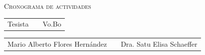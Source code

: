 \documentclass[landscape]{article}
\begin{document}
\begin{figure}[h]
\vspace{-3cm}
\begin{center} {\scshape\LARGE Cronograma de actividades \par} \end{center}
\vspace{0.2cm}
\hspace{3.5cm}
 \vspace{1cm}
      
\begin{tabular}{p{}cp{}}
  \centering Tesista & & \centering Vo.Bo \\
\end{tabular}

\begin{tabular}{p{}cp{}}
  \cline{1-1} \cline{3-3} \\
  \centering Mario Alberto Flores Hernández & & \centering Dra. Satu Elisa Schaeffer 
\end{tabular}
\end{figure}

\end{document}
